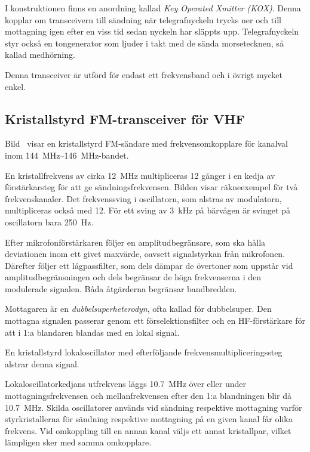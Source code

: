 I konstruktionen finns en anordning kallad \emph{Key Operated Xmitter (KOX)}.
Denna kopplar om transceivern till sändning när telegrafnyckeln trycks ner och
till mottagning igen efter en viss tid sedan nyckeln har släppts upp.
Telegrafnyckeln styr också en tongenerator som ljuder i takt med de sända
morsetecknen, så kallad medhörning.

Denna transceiver är utförd för endast ett frekvensband och i övrigt
mycket enkel.

\subsection{Kristallstyrd FM-transceiver för VHF}

Bild~ visar en kristallstyrd FM-sändare med
frekvensomkopplare för kanalval inom \SIrange{144}{146}{\mega\hertz}-bandet.

En kristallfrekvens av cirka \qty{12}{\mega\hertz} multipliceras 12 gånger i en
kedja av förstärkarsteg för att ge sändningsfrekvensen.
Bilden visar räkneexempel för två frekvenskanaler.
Det frekvenssving i oscillatorn, som alstras av modulatorn,
multipliceras också med 12.
För ett sving av \qty{3}{\kilo\hertz} på bärvågen är svinget på oscillatorn bara
\qty{250}{\hertz}.

Efter mikrofonförstärkaren följer en amplitudbegränsare, som ska
hålla deviationen inom ett givet maxvärde, oavsett signalstyrkan från
mikrofonen.
Därefter följer ett lågpassfilter, som dels dämpar de övertoner som
uppstår vid amplitudbegränsningen och dels begränsar de höga frekvenserna
i den modulerade signalen.
Båda åtgärderna begränsar bandbredden.

Mottagaren är en \emph{dubbelsuperheterodyn}, ofta kallad för dubbelsuper.
Den mottagna signalen passerar genom ett förselektionsfilter och en
HF-förstärkare för att i 1:a blandaren blandas med en lokal signal.


En kristallstyrd lokaloscillator med efterföljande
frekvensmultipliceringssteg alstrar denna signal.

Lokaloscillatorkedjans utfrekvens läggs \qty{10,7}{\mega\hertz} över eller under
mottagningsfrekvensen och mellanfrekvensen efter den 1:a blandningen blir då
\qty{10,7}{\mega\hertz}.
Skilda oscillatorer används vid sändning respektive mottagning varför
styrkristallerna för sändning respektive mottagning på en given kanal får
olika frekvens.
Vid omkoppling till en annan kanal väljs ett annat kristallpar, vilket
lämpligen sker med samma omkopplare.

